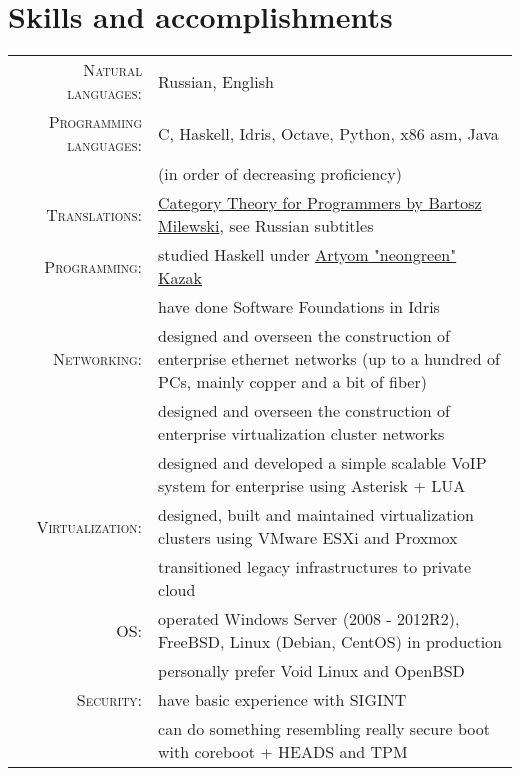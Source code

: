 \documentclass[a4paper,11pt]{article}
\begin{document}
  \section{Skills and accomplishments}
    \begin{longtable}{rp{}}
      \textsc{Natural languages:} & Russian, English \\

      \textsc{Programming languages:} & C, Haskell, Idris, Octave, Python, x86 asm, Java \\
                                      & (in order of decreasing proficiency)             \\

      \textsc{Translations:} & \href{https://www.youtube.com/playlist?list=PLbgaMIhjbmEnaH\_LTkxLI7FMa2HsnawM\_}
                               {Category Theory for Programmers by Bartosz Milewski}, see Russian subtitles      \\

      \textsc{Programming:} & studied Haskell under \href{https://artyom.me}{Artyom "neongreen" Kazak} \\
                            & have done Software Foundations in Idris                                  \\

      \textsc{Networking:} & designed and overseen the construction of enterprise ethernet
                             networks (up to a hundred of PCs, mainly copper and a bit of fiber) \\
                           & designed and overseen the construction of enterprise virtualization
                             cluster networks                                                    \\
                           & designed and developed a simple scalable VoIP system for enterprise
                             using Asterisk + LUA                                                \\

      \textsc{Virtualization:} & designed, built and maintained virtualization clusters using VMware ESXi and Proxmox \\
                               & transitioned legacy infrastructures to private cloud                                 \\

      \textsc{OS:} & operated Windows Server (2008 - 2012R2), FreeBSD, Linux (Debian, CentOS) in production \\
                   & personally prefer Void Linux and OpenBSD                                               \\

      \textsc{Security:} & have basic experience with SIGINT                                            \\
                         & can do something resembling really secure boot with coreboot + HEADS and TPM \\
    \end{longtable}
\end{document}
